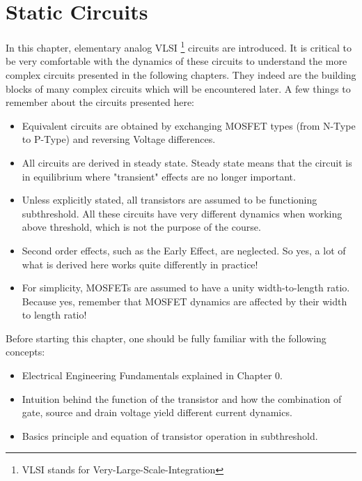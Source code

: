 \newpage
\section{Static Circuits}
In this chapter, elementary analog VLSI \footnote{VLSI stands for Very-Large-Scale-Integration} circuits are introduced. It is critical to be very comfortable with the dynamics of these circuits to understand the more complex circuits presented in the following chapters. They indeed are the building blocks of many complex circuits which will be encountered later. A few things to remember about the circuits presented here: 
\begin{itemize}
    \item Equivalent circuits are obtained by exchanging MOSFET types (from N-Type to P-Type) and reversing Voltage differences.
    \item All circuits are derived in steady state. Steady state means that the circuit is in equilibrium where "transient" effects are no longer important. 
    \item Unless explicitly stated, all transistors are assumed to be functioning subthreshold. All these circuits have very different dynamics when working above threshold, which is not the purpose of the course. 
    \item Second order effects, such as the Early Effect, are neglected. So yes, a lot of what is derived here works quite differently in practice!
    \item For simplicity, MOSFETs are assumed to have a unity width-to-length ratio. Because yes, remember that MOSFET dynamics are affected by their width to length ratio! 
\end{itemize}

Before starting this chapter, one should be fully familiar with the following concepts: 
\begin{itemize}
    \item Electrical Engineering Fundamentals explained in Chapter 0.
    \item Intuition behind the function of the transistor and how the combination of gate, source and drain voltage yield different current dynamics. 
    \item Basics principle and equation of transistor operation in subthreshold. 
\end{itemize}








